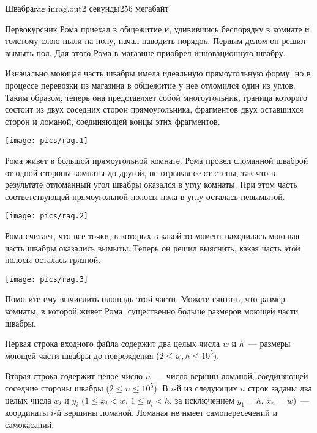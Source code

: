 \begin{problem}{Швабра}{rag.in}{rag.out}{2 секунды}{256 мегабайт}


Первокурсник Рома приехал в общежитие и, удивившись беспорядку 
в комнате и толстому слою пыли на полу, начал наводить порядок. 
Первым делом он решил вымыть пол. 
Для этого Рома в магазине приобрел инновационную швабру.

Изначально моющая часть швабры имела идеальную прямоугольную форму, но в процессе
перевозки из магазина в общежитие у нее отломился один из углов. 
Таким образом, теперь она представляет собой многоугольник,
граница которого состоит из двух соседних сторон прямоугольника,
фрагментов двух оставшихся сторон и ломаной,
соединяющей концы этих фрагментов.

\begin{center}
\texttt{[image: pics/rag.1]}
\end{center}

Рома живет в большой прямоугольной комнате.
Рома провел сломанной шваброй от одной стороны комнаты до другой, 
не отрывая ее от стены, так что в результате отломанный угол швабры
оказался в углу комнаты. При этом часть соответствующей прямоугольной полосы пола 
в углу осталась невымытой. 

\begin{center}
\texttt{[image: pics/rag.2]}
\end{center}

Рома считает, что все точки, в которых в какой-то момент находилась
моющая часть швабры оказались вымыты. Теперь он решил выяснить, какая часть этой полосы 
осталась грязной. 

\begin{center}
\texttt{[image: pics/rag.3]}
\end{center}

Помогите ему вычислить площадь этой части.
Можете считать, что размер комнаты, в которой живет Рома, существенно больше 
размеров моющей части швабры.

\InputFile
Первая строка входного файла содержит два целых числа $w$ и $h$~--- размеры моющей
части швабры до повреждения ($2 \le w, h \le 10^5$).

Вторая строка содержит целое число $n$~--- число вершин ломаной, 
соединяющей соседние стороны швабры ($2 \le n \le 10^5$).
В $i$-й из следующих $n$ строк заданы два целых числа 
$x_i$ и $y_i$ ($1 \le x_i < w$, $1 \le y_i < h$, за исключением $y_1 = h$, $x_n = w$)~--- координаты $i$-й
вершины ломаной.
Ломаная не имеет самопересечений и самокасаний.


\end{problem}
